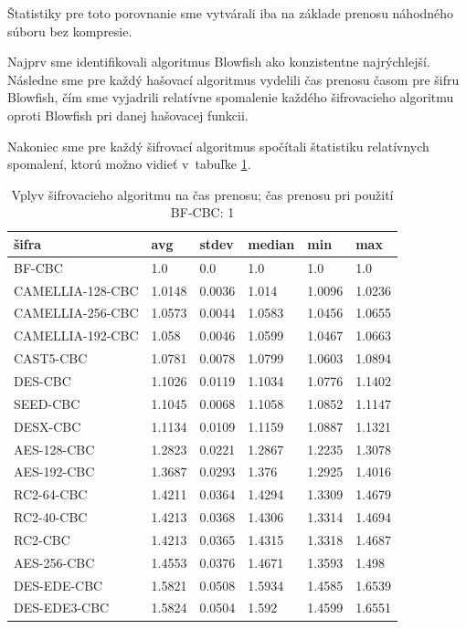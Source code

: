 \documentclass[12pt,a4paper]{article}
\begin{document}
Štatistiky pre toto porovnanie sme vytvárali iba na základe prenosu
náhodného súboru bez kompresie.

Najprv sme identifikovali algoritmus Blowfish ako konzistentne
najrýchlejší. Následne sme pre každý hašovací algoritmus vydelili čas
prenosu časom pre šifru Blowfish, čím sme vyjadrili relatívne spomalenie
každého šifrovacieho algoritmu oproti Blowfish pri danej hašovacej funkcii.

Nakoniec sme pre každý šifrovací algoritmus spočítali štatistiku
relatívnych spomalení, ktorú možno vidieť v~tabuľke
\ref{tbl:cipher-comparison}.

\begin{table}\centering
    \caption{Vplyv šifrovacieho algoritmu na čas prenosu; čas prenosu pri použití BF-CBC: 1}
    \label{tbl:cipher-comparison}
    \begin{tabular}{|l||l|l|l|l|l|}
        \hline
        \bf šifra & \bf  avg & \bf stdev & \bf median & \bf min & \bf max \\ \hline 
        BF-CBC & 1.0 & 0.0 & 1.0 & 1.0 & 1.0\\ \hline
        CAMELLIA-128-CBC & 1.0148 & 0.0036 & 1.014 & 1.0096 & 1.0236 \\ \hline
        CAMELLIA-256-CBC & 1.0573 & 0.0044 & 1.0583 & 1.0456 & 1.0655 \\ \hline
        CAMELLIA-192-CBC & 1.058 & 0.0046 & 1.0599 & 1.0467 & 1.0663 \\ \hline
        CAST5-CBC & 1.0781 & 0.0078 & 1.0799 & 1.0603 & 1.0894 \\ \hline
        DES-CBC & 1.1026 & 0.0119 & 1.1034 & 1.0776 & 1.1402 \\ \hline
        SEED-CBC & 1.1045 & 0.0068 & 1.1058 & 1.0852 & 1.1147 \\ \hline
        DESX-CBC & 1.1134 & 0.0109 & 1.1159 & 1.0887 & 1.1321 \\ \hline
        AES-128-CBC & 1.2823 & 0.0221 & 1.2867 & 1.2235 & 1.3078 \\ \hline
        AES-192-CBC & 1.3687 & 0.0293 & 1.376 & 1.2925 & 1.4016 \\ \hline
        RC2-64-CBC & 1.4211 & 0.0364 & 1.4294 & 1.3309 & 1.4679 \\ \hline
        RC2-40-CBC & 1.4213 & 0.0368 & 1.4306 & 1.3314 & 1.4694 \\ \hline
        RC2-CBC & 1.4213 & 0.0365 & 1.4315 & 1.3318 & 1.4687 \\ \hline
        AES-256-CBC & 1.4553 & 0.0376 & 1.4671 & 1.3593 & 1.498 \\ \hline
        DES-EDE-CBC & 1.5821 & 0.0508 & 1.5934 & 1.4585 & 1.6539 \\ \hline
        DES-EDE3-CBC & 1.5824 & 0.0504 & 1.592 & 1.4599 & 1.6551 \\ \hline
    \end{tabular}
\end{table}
\end{document}
